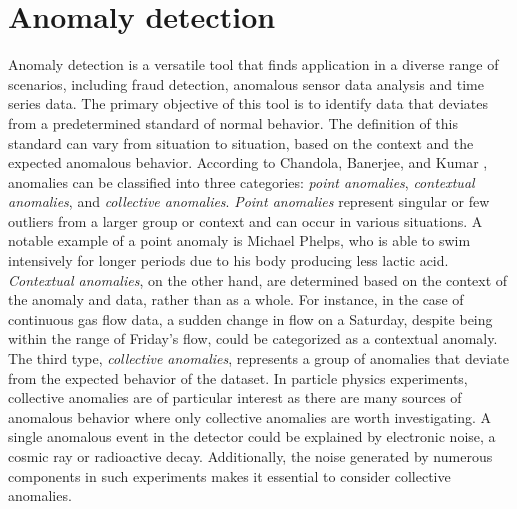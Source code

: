 \section{Anomaly detection}
Anomaly detection is a versatile tool that finds application in a diverse range of scenarios, 
including fraud detection, anomalous sensor data analysis and time series data. The primary 
objective of this tool is to identify data that deviates from a predetermined standard of 
normal behavior. The definition of this standard can vary from situation to situation, based 
on the context and the expected anomalous behavior. According to Chandola, Banerjee, and 
Kumar \cite{anom_detec}, anomalies can be classified into three categories: \textit{point anomalies}, 
\textit{contextual anomalies}, and \textit{collective anomalies}. \textit{Point anomalies} represent singular or few 
outliers from a larger group or context and can occur in various situations. A notable example 
of a point anomaly is Michael Phelps, who is able to swim intensively for longer periods due 
to his body producing less lactic acid. \textit{Contextual anomalies}, on the other hand, are determined 
based on the context of the anomaly and data, rather than as a whole. For instance, in the 
case of continuous gas flow data, a sudden change in flow on a Saturday, despite being within 
the range of Friday's flow, could be categorized as a contextual anomaly. The third type, 
\textit{collective anomalies}, represents a group of anomalies that deviate from the expected behavior 
of the dataset. In particle physics experiments, collective anomalies are of particular 
interest as there are many sources of anomalous behavior where only collective anomalies are 
worth investigating. A single anomalous event in the detector could be explained by electronic noise, 
a cosmic ray or radioactive decay. Additionally, the noise generated by numerous components in such 
experiments makes it essential to consider collective anomalies.
